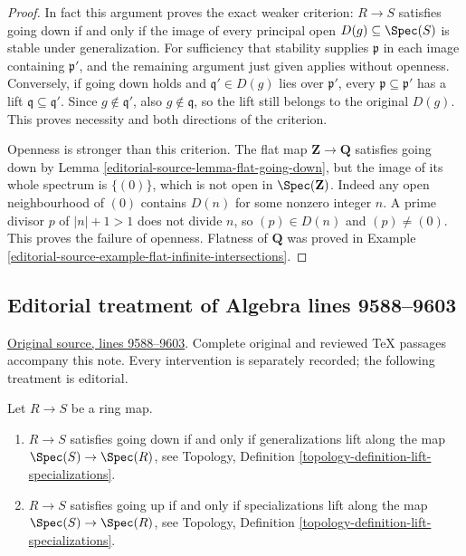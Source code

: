 \begin{proof}
In fact this argument proves the exact weaker criterion:
$R\to S$ satisfies going down if and only if the image
of every principal open $D(g)\subseteq\Spec(S)$ is stable
under generalization. For sufficiency that stability
supplies $\mathfrak p$ in each image containing
$\mathfrak p'$, and the remaining argument just given
applies without openness. Conversely, if going down
holds and $\mathfrak q'\in D(g)$ lies over
$\mathfrak p'$, every $\mathfrak p\subseteq\mathfrak p'$
has a lift $\mathfrak q\subseteq\mathfrak q'$.
Since $g\notin\mathfrak q'$, also $g\notin\mathfrak q$,
so the lift still belongs to the original $D(g)$.
This proves necessity and both directions of the criterion.

Openness is stronger than this criterion. The flat map
$\mathbf Z\to\mathbf Q$ satisfies going down by
Lemma \ref{editorial-source-lemma-flat-going-down}, but the image of its
whole spectrum is $\{(0)\}$, which is not open in
$\Spec(\mathbf Z)$. Indeed any open neighbourhood of
$(0)$ contains $D(n)$ for some nonzero integer $n$.
A prime divisor $p$ of $|n|+1>1$ does not divide $n$,
so $(p)\in D(n)$ and $(p)\ne(0)$. This proves the
failure of openness. Flatness of $\mathbf Q$ was proved
in Example \ref{editorial-source-example-flat-infinite-intersections}.
\end{proof}


\subsection{Editorial treatment of Algebra lines 9588--9603}

\hypertarget{algebra-context-106}{}

\noindent\href{https://github.com/stacks/stacks-project/blob/a04446e57ec1fbc252a871afcec7752fb2807b14/algebra.tex\#L9588}{Original source, lines 9588--9603}. Complete original and reviewed TeX passages accompany this note. Every intervention is separately recorded; the following treatment is editorial.


\begin{lemma}
\label{editorial-source-lemma-going-up-down-specialization}
Let $R \to S$ be a ring map.
\begin{enumerate}
\item $R \to S$ satisfies going down if and only if
generalizations lift along the map $\Spec(S) \to \Spec(R)$,
see Topology, Definition \ref{topology-definition-lift-specializations}.
\item $R \to S$ satisfies going up if and only if
specializations lift along the map $\Spec(S) \to \Spec(R)$,
see Topology, Definition \ref{topology-definition-lift-specializations}.
\end{enumerate}
\end{lemma}

